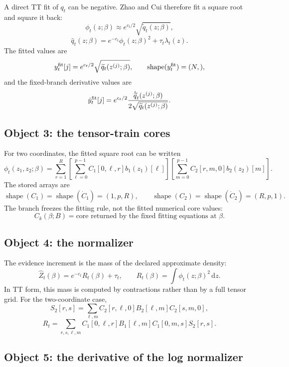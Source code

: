 \documentclass[11pt]{article}
\newcommand{\dd}{\,\mathrm d}
\newcommand{\shape}{\operatorname{shape}}
\begin{document}
A direct TT fit of \(q_t\) can be negative.  Zhao and Cui \cite{zhao2024ttsequential} therefore fit a square
root and square it back:
\[
    \phi_t(z;\beta)\approx e^{c_t/2}\sqrt{\widetilde q_t(z;\beta)},
    \label{eq:p24-p22-o6}
\]
\[
    \widehat q_t(z;\beta)
    =
    e^{-c_t}\phi_t(z;\beta)^2+\tau_t\lambda_t(z).
    \label{eq:p24-p22-o7}
\]
The fitted values are
\[
    y_t^{\rm fit}[j]
    =
    e^{c_t/2}\sqrt{\widetilde q_t(z^{(j)};\beta)},
    \qquad
    \shape(y_t^{\rm fit})=(N,),
    \label{eq:p24-p22-o8}
\]
and the fixed-branch derivative values are
\[
    \dot y_t^{\rm fit}[j]
    =
    e^{c_t/2}
    \frac{\dot{\widetilde q}_t(z^{(j)};\beta)}
    {2\sqrt{\widetilde q_t(z^{(j)};\beta)}}.
    \label{eq:p24-p22-o9}
\]

\subsection*{Object 3: the tensor-train cores}

For two coordinates, the fitted square root can be written
\[
    \phi_t(z_1,z_2;\beta)
    =
    \sum_{r=1}^{R}
    \left[
    \sum_{\ell=0}^{p-1}C_1[0,\ell,r]b_1(z_1)[\ell]
    \right]
    \left[
    \sum_{m=0}^{p-1}C_2[r,m,0]b_2(z_2)[m]
    \right].
    \label{eq:p24-p22-o10}
\]
The stored arrays are
\[
    \shape(C_1)=\shape(\dot C_1)=(1,p,R),
    \qquad
    \shape(C_2)=\shape(\dot C_2)=(R,p,1).
    \label{eq:p24-p22-o11}
\]
The branch freezes the fitting rule, not the fitted numerical core values:
\[
    C_k(\beta;B)
    =
    \text{core returned by the fixed fitting equations at }\beta.
    \label{eq:p24-p22-o12}
\]

\subsection*{Object 4: the normalizer}

The evidence increment is the mass of the declared approximate density:
\[
    \widehat Z_t(\beta)
    =
    e^{-c_t}R_t(\beta)+\tau_t,
    \qquad
    R_t(\beta)=\int\phi_t(z;\beta)^2\dd z.
    \label{eq:p24-p22-o13}
\]
In TT form, this mass is computed by contractions rather than by a full tensor
grid.  For the two-coordinate case,
\[
    S_2[r,s]
    =
    \sum_{\ell,m}
    C_2[r,\ell,0]B_2[\ell,m]C_2[s,m,0],
    \label{eq:p24-p22-o14}
\]
\[
    R_t
    =
    \sum_{r,s,\ell,m}
    C_1[0,\ell,r]B_1[\ell,m]C_1[0,m,s]S_2[r,s].
    \label{eq:p24-p22-o15}
\]

\subsection*{Object 5: the derivative of the log normalizer}
\end{document}
